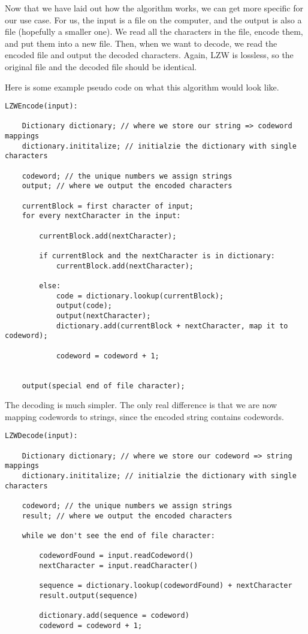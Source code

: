 \documentclass[12pt,twoside]{reedthesis}
\begin{document}
Now that we have laid out how the algorithm works, we can get more specific for our use case. For us, the input is a file on the computer, and the output is also a file (hopefully a smaller one). We read all the characters in the file, encode them, and put them into a new file. Then, when we want to decode, we read the encoded file and output the decoded characters. Again, LZW is lossless, so the original file and the decoded file should be identical.

Here is some example pseudo code on what this algorithm would look like.
\begin{verbatim}
LZWEncode(input):

    Dictionary dictionary; // where we store our string => codeword mappings
    dictionary.inititalize; // initialzie the dictionary with single characters

    codeword; // the unique numbers we assign strings
    output; // where we output the encoded characters

    currentBlock = first character of input;
    for every nextCharacter in the input:

        currentBlock.add(nextCharacter);

        if currentBlock and the nextCharacter is in dictionary:
            currentBlock.add(nextCharacter);
            
        else:
            code = dictionary.lookup(currentBlock);
            output(code);
            output(nextCharacter);
            dictionary.add(currentBlock + nextCharacter, map it to codeword);

            codeword = codeword + 1;


    output(special end of file character);
\end{verbatim}
The decoding is much simpler. The only real difference is that we are now mapping codewords to strings, since the encoded string contains codewords.
\begin{verbatim}
LZWDecode(input):

    Dictionary dictionary; // where we store our codeword => string mappings
    dictionary.inititalize; // initialzie the dictionary with single characters

    codeword; // the unique numbers we assign strings
    result; // where we output the encoded characters

    while we don't see the end of file character:

        codewordFound = input.readCodeword()
        nextCharacter = input.readCharacter()

        sequence = dictionary.lookup(codewordFound) + nextCharacter
        result.output(sequence)

        dictionary.add(sequence = codeword)
        codeword = codeword + 1;
\end{verbatim}
\end{document}
